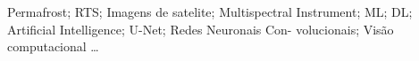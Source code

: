 


%
%

\begin{keywords}
  Permafrost; \gls{RTS}; Imagens de satelite;  Multispectral Instrument; \gls{ML}; \gls{DL}; Artificial Intelligence; U-Net; Redes Neuronais Con-
  volucionais; Visão computacional \ldots
\end{keywords}
